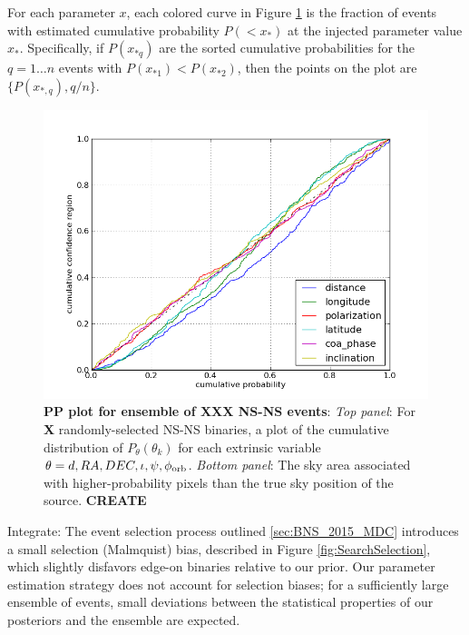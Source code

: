 
For each parameter $x$, each colored curve in Figure  \ref{fig:pp:2015Ensemble} is  the fraction of events with
estimated cumulative probability $P(<x_*)$ at the injected parameter value $x_*$.  
Specifically, if $P(x_{*q})$ are the sorted cumulative probabilities for the $q=1\ldots n$ events with
$P(x_{*1})<P(x_{*2})$, then the points on the plot are $\{P(x_{*,q}),q/n\}$.  
%

\begin{figure}
\includegraphics[width=\columnwidth]{../Figures/v1_2015_BNS_MDC_skysampling_pp_plot}  %
\caption{\label{fig:pp:2015Ensemble}\textbf{PP plot for ensemble of XXX NS-NS events}: \emph{Top panel}: For \textbf{X} randomly-selected NS-NS binaries, a plot of
  the cumulative distribution of $P_\theta(\theta_k)$ for each extrinsic variable $\theta=d,RA,DEC,\iota,\psi,\phi_{\rm
    orb}$.  
\emph{Bottom panel}: The sky area associated with higher-probability pixels than the true sky position of the source. \textbf{CREATE}
}
\end{figure}

{\color{blue} Integrate: The event selection process outlined \ref{sec:BNS_2015_MDC} introduces a small selection (Malmquist) bias, described in Figure \ref{fig:SearchSelection}, which slightly disfavors edge-on binaries relative to our prior.  Our parameter estimation strategy does not account for selection biases; for a sufficiently large ensemble of events, small deviations between the statistical properties of our posteriors and the ensemble are expected. }


